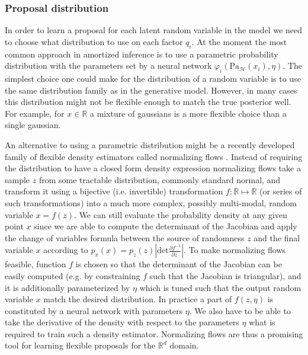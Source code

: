 \documentclass[12pt]{article}
\begin{document}
\subsubsection*{Proposal distribution}

In order to learn a proposal for each latent random variable in the model we need to choose what distribution to use on each factor $q_i$.
At the moment the most common approach in amortized inference is to use a parametric probability distribution with the parameters set by a neural network $\varphi_i(\text{Pa}_\mathcal{H}(x_i), \eta)$.
The simplest choice one could make for the distribution of a random variable is to use the same distribution family as in the generative model.
However, in many cases this distribution might not be flexible enough to match the true posterior well.
For example, for $x \in \mathbb{R}$ a mixture of gaussians is a more flexible choice than a single gaussian.


An alternative to using a parametric distribution might be a recently developed family of flexible density estimators called normalizing flows \citep{RezendeMohamed2015,IAF,MAF}.
Instead of requiring the distribution to have a closed form density expression normalizing flows take a sample $z$ from some tractable distribution, commonly standard normal, and transform it using a bijective (i.e. invertible) transformation $f: \mathbb{R} \mapsto \mathbb{R}$ (or series of such transformations) into a much more complex, possibly multi-modal, random variable $x=f(z)$.
We can still evaluate the probability density at any given point $x$ since we are able to compute the determinant of the Jacobian and apply the change of variables formula between the source of randomness $z$ and the final variable $x$ according to 
$p_x(x) = p_z(z) \left|
    \mathrm{det} \frac{
      \partial f^{-1}
    }{
      \partial z\
    }
  \right|$.
To make normalizing flows feasible, function $f$ is chosen so that the determinant of the Jacobian can be easily computed (e.g. by constraining $f$ such that the Jacobian is triangular), and it is additionally parameterized by $\eta$ which is tuned such that the output random variable $x$ match the desired distribution. In practice a part of $f(z, \eta)$ is constituted by a neural network with parameters $\eta$.
We also have to be able to take the derivative of the density with respect to the parameters $\eta$ what is required to train such a density estimator.
Normalizing flows are thus a promising tool for learning flexible proposals for the $\mathbb{R}^d$ domain.
\end{document}
